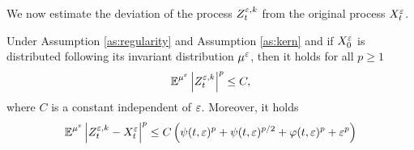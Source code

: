 \documentclass[10pt]{article}
\begin{document}
We now estimate the deviation of the process $Z_t^{\varepsilon, k}$ from the original process $X_t^\varepsilon$.
\begin{lemma}\label{lem:boundDiff} Under Assumption \ref{as:regularity} and Assumption \ref{as:kern} and if $X_0^\varepsilon$ is distributed following its invariant distribution $\mu^\varepsilon$, then it holds for all $p \geq 1$ 
	\begin{equation}\label{eq:boundDiff1}
		\operatorname{\mathbb{E}}^{\mu^\varepsilon} \left\lvert Z_t^{\varepsilon, k}\right\rvert^p \leq C,
	\end{equation}
	where $C$ is a constant independent of $\varepsilon$. Moreover, it holds
	\begin{equation}\label{eq:boundDiff2}
		\operatorname{\mathbb{E}}^{\mu^\varepsilon} \left\lvert Z_t^{\varepsilon, k} - X_t^\varepsilon\right\rvert^p \leq C\left(\psi(t, \varepsilon)^p + \psi(t, \varepsilon)^{p/2} + \varphi(t, \varepsilon)^p + \varepsilon^p \right)
	\end{equation}
\end{lemma}
\end{document}
